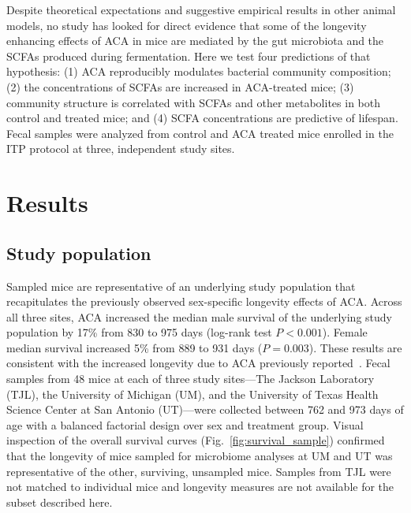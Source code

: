 \documentclass{doc/template/bmcart-nofigbox}
\begin{document}
Despite theoretical expectations and suggestive empirical results in other
animal models,
no study has looked for direct evidence that some of the longevity enhancing
effects of ACA in mice are mediated by the gut microbiota and the SCFAs
produced during fermentation.
Here we test four predictions of that hypothesis:
(1) ACA reproducibly modulates bacterial community composition;
(2) the concentrations of SCFAs are increased in ACA-treated mice;
(3) community structure is correlated with SCFAs and other metabolites in
both control and treated mice; and
(4) SCFA concentrations are predictive of lifespan.
Fecal samples were analyzed from control and ACA treated mice enrolled in the
ITP protocol at three, independent study sites.

\section*{Results}

\subsection*{Study population}

Sampled mice are representative of an underlying study population that
recapitulates the previously observed sex-specific longevity effects of ACA\@.
Across all three sites, ACA increased the median male survival of the
underlying study population by 17\% from 830 to 975 days
(log-rank test $P < 0.001$).
Female median survival increased 5\% from 889 to 931 days ($P = 0.003$).
These results are consistent with the increased longevity due to ACA
previously reported~\cite{Harrison2014}.
Fecal samples from 48 mice at each of three study sites---The Jackson
Laboratory (TJL), the University of Michigan (UM), and the University of Texas
Health Science Center at San Antonio (UT)---were collected between 762 and
973 days of age with a balanced factorial design over sex and treatment group.
Visual inspection of the overall survival curves (Fig.~\ref{fig:survival_sample})
confirmed that the longevity of mice sampled for microbiome analyses at UM and
UT was representative of the other, surviving, unsampled mice.
Samples from TJL were not matched to individual mice and longevity measures
are not available for the subset described here.
\end{document}
